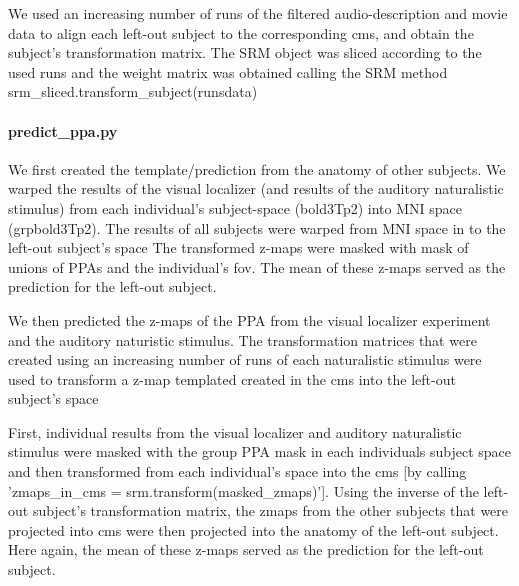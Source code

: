 We used an increasing number of runs of the filtered audio-description and movie
data to align each left-out subject to the corresponding \ac{cms}, and obtain
the subject's transformation matrix.
%
The SRM object was sliced according to the used runs and the weight matrix was
obtained calling the SRM method srm\_sliced.transform\_subject(runsdata)


\paragraph{predict\_ppa.py}

We first created the template/prediction from the anatomy of other subjects.
%
We warped the results of the visual localizer (and results of the auditory
naturalistic stimulus) from each individual's subject-space (bold3Tp2) into MNI
space (grpbold3Tp2).
The results of all subjects were warped from MNI space in to the left-out
subject's space
The transformed z-maps were masked with mask of unions of PPAs and the
individual's \ac{fov}.
%
The mean of these z-maps served as the prediction for the left-out subject.

We then predicted the z-maps of the PPA from the visual localizer experiment and
the auditory naturistic stimulus.
%
The transformation matrices that were created using an increasing number of runs
of each naturalistic stimulus were used to transform a z-map templated created
in the \ac{cms} into the left-out subject's space

First, individual results from the visual localizer and auditory naturalistic
stimulus were masked with the group PPA mask in each individuals subject space
and then transformed from each individual's space into the \ac{cms} [by calling
'zmaps\_in\_cms = srm.transform(masked\_zmaps)'].
Using the inverse of the left-out subject's transformation matrix, the zmaps
from the other subjects that were projected into \ac{cms} were then projected
into the anatomy of the left-out subject.
%
Here again, the mean of these z-maps served as the prediction for the left-out
subject.

